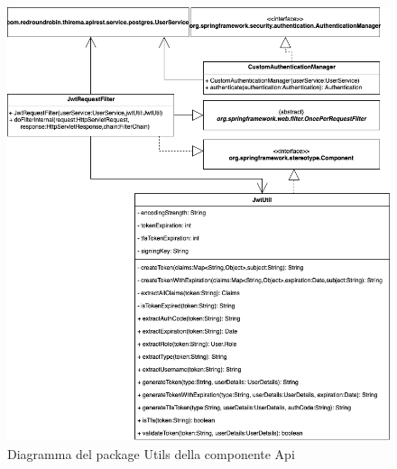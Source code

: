 		
		\begin{figure}[H]
			\centering
			\includegraphics[scale=0.550]{res/images/API/UtilsPackage.png}
			\caption{Diagramma del package Utils della componente Api}
			\label{Diagramma 11}
		\end{figure}
